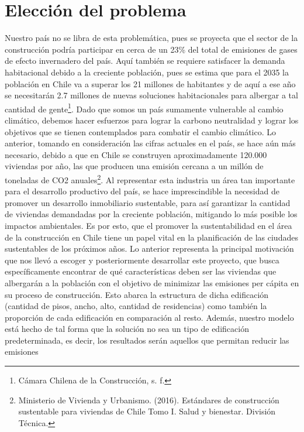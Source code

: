 \documentclass[letterpaper]{article}
\begin{document}
\section{Elección del problema}
Nuestro país no se libra de esta problemática, pues se proyecta que el sector de la construcción podría participar en cerca de un 23\%  del total de emisiones de gases de efecto invernadero del país. 
Aquí también se requiere satisfacer la demanda habitacional debido a la creciente población, pues se estima que para el 2035
la población en Chile va a superar los 21 millones de habitantes y de aquí a ese año se necesitarán 2.7 millones de nuevas soluciones habitacionales para albergar a tal cantidad de gente\footnote{Cámara Chilena de la Construcción, s. f.}.
Dado que somos un país sumamente vulnerable al cambio climático, debemos hacer esfuerzos para lograr la carbono neutralidad y lograr los objetivos que se tienen
contemplados para combatir el cambio climático. Lo anterior, tomando en consideración las cifras actuales en el país, se hace aún más necesario, debido a que en Chile
se construyen aproximadamente 120.000 viviendas por año, las que producen una emisión cercana a un millón de toneladas de CO2 anuales\footnote{Ministerio de Vivienda y Urbanismo. (2016). Estándares de construcción sustentable para viviendas de Chile Tomo I. Salud y bienestar. División Técnica.}.
Al representar esta industria un área tan importante para el desarrollo productivo del país, se hace imprescindible la necesidad de promover un desarrollo
inmobiliario sustentable, para así garantizar la cantidad de viviendas demandadas por la creciente población, mitigando lo más posible los impactos ambientales.
Es por esto, que el promover la sustentabilidad en el área de la construcción en Chile tiene un papel vital en la planificación de las ciudades sustentables de los
próximos años. \newline \newline Lo anterior representa la principal motivación que nos llevó a escoger y posteriormente desarrollar este proyecto, que busca específicamente encontrar
de qué características deben ser las viviendas que albergarán a la población con el objetivo de minimizar las emisiones per cápita en su proceso de construcción.
Esto abarca la estructura de dicha edificación (cantidad de pisos, ancho, alto, cantidad de residencias) como también la proporción de cada edificación en comparación al resto.
Además, nuestro modelo está hecho de tal forma que la solución no sea un tipo de edificación predeterminada, es decir, los resultados serán aquellos que permitan reducir las emisiones
\end{document}
